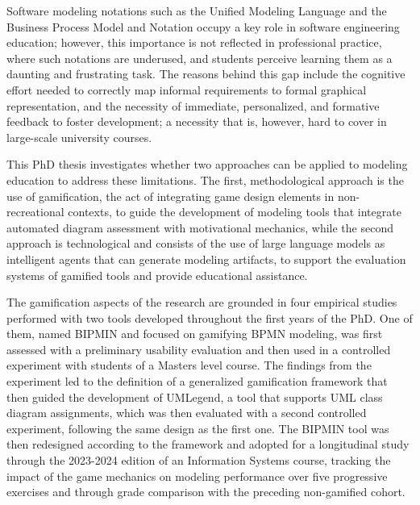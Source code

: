 
\summary

Software modeling notations such as the Unified Modeling Language and the Business Process Model and Notation occupy a key role in software engineering education; however, this importance is not reflected in professional practice, where such notations are underused, and students perceive learning them as a daunting and frustrating task. The reasons behind this gap include the cognitive effort needed to correctly map informal requirements to formal graphical representation, and the necessity of immediate, personalized, and formative feedback to foster development; a necessity that is, however, hard to cover in large-scale university courses. 

This PhD thesis investigates whether two approaches can be applied to modeling education to address these limitations. The first, methodological approach is the use of gamification, the act of integrating game design elements in non-recreational contexts, to guide the development of modeling tools that integrate automated diagram assessment with motivational mechanics, while the second approach is technological and consists of the use of large language models as intelligent agents that can generate modeling artifacts, to support the evaluation systems of gamified tools and provide educational assistance.

The gamification aspects of the research are grounded in four empirical studies performed with two tools developed throughout the first years of the PhD. One of them, named BIPMIN and focused on gamifying BPMN modeling, was first assessed with a preliminary usability evaluation and then used in a controlled experiment with students of a Masters level course. The findings from the experiment led to the definition of a generalized gamification framework that then guided the development of UMLegend, a tool that supports UML class diagram assignments, which was then evaluated with a second controlled experiment, following the same design as the first one. The BIPMIN tool was then redesigned according to the framework and adopted for a longitudinal study through the 2023-2024 edition of an Information Systems course, tracking the impact of the game mechanics on modeling performance over five progressive exercises and through grade comparison with the preceding non-gamified cohort.

